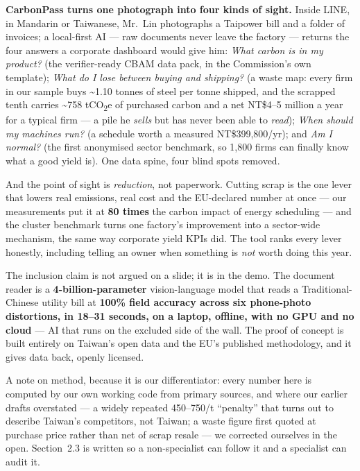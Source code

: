 \documentclass[11pt]{article}
\newcommand{\euro}{\texteuro}
\begin{document}
\textbf{CarbonPass turns one photograph into four kinds of sight.} Inside LINE, in Mandarin or Taiwanese, Mr.\ Lin photographs a Taipower bill and a folder of invoices; a local-first AI --- raw documents never leave the factory --- returns the four answers a corporate dashboard would give him: \emph{What carbon is in my product?} (the verifier-ready CBAM data pack, in the Commission's own template); \emph{What do I lose between buying and shipping?} (a waste map: every firm in our sample buys \textasciitilde1.10 tonnes of steel per tonne shipped, and the scrapped tenth carries \textasciitilde758 tCO\textsubscript{2}e of purchased carbon and a net NT\$4--5 million a year for a typical firm --- a pile he \emph{sells} but has never been able to \emph{read}); \emph{When should my machines run?} (a schedule worth a measured NT\$399{,}800/yr); and \emph{Am I normal?} (the first anonymised sector benchmark, so 1{,}800 firms can finally know what a good yield is). One data spine, four blind spots removed.

And the point of sight is \emph{reduction}, not paperwork. Cutting scrap is the one lever that lowers real emissions, real cost and the EU-declared number at once --- our measurements put it at \textbf{80 times} the carbon impact of energy scheduling --- and the cluster benchmark turns one factory's improvement into a sector-wide mechanism, the same way corporate yield KPIs did. The tool ranks every lever honestly, including telling an owner when something is \emph{not} worth doing this year.

The inclusion claim is not argued on a slide; it is in the demo. The document reader is a \textbf{4-billion-parameter} vision-language model that reads a Traditional-Chinese utility bill at \textbf{100\% field accuracy across six phone-photo distortions, in 18--31 seconds, on a laptop, offline, with no GPU and no cloud} --- AI that runs on the excluded side of the wall. The proof of concept is built entirely on Taiwan's open data and the EU's published methodology, and it gives data back, openly licensed.

A note on method, because it is our differentiator: every number here is computed by our own working code from primary sources, and where our earlier drafts overstated --- a widely repeated \euro{}450--750/t ``penalty'' that turns out to describe Taiwan's competitors, not Taiwan; a waste figure first quoted at purchase price rather than net of scrap resale --- we corrected ourselves in the open. Section~2.3 is written so a non-specialist can follow it and a specialist can audit it.
\end{document}
